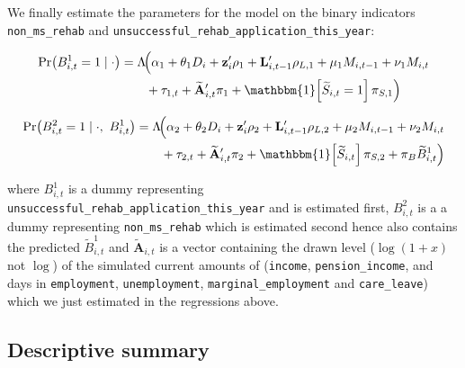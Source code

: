 \documentclass[a4paper,12pt]{article}
\theoremstyle{plain}
\theoremstyle{definition}
\theoremstyle{TheoremNum}
\theoremstyle{CorollaryNum}
\theoremstyle{PropositionNum}
\theoremstyle{TheoremNum}
\begin{document}
We finally estimate the parameters for the model on the binary indicators \texttt{non\_ms\_rehab} and \texttt{unsuccessful\_rehab\_application\_this\_year}:

\begin{align*}
\Pr\!\left(B_{i,t}^{1}=1 \mid \cdot\right)
&=
\Lambda\!\Big(
    \alpha_1
    + \theta_1 D_i
    + \mathbf{z}_i'\rho_1
    + \mathbf{L}_{i,t-1}'\rho_{L,1}
    + \mu_1 M_{i,t-1}
    + \nu_1 M_{i,t} \\
&\qquad
    + \tau_{1,t}
    + \widetilde{\mathbf{A}}_{i,t}'\pi_1
    + \mathbbm{1}\!\left[\widetilde{S}_{i,t}=1\right]\pi_{S,1}
\Big)
\end{align*}

\begin{align*}
\Pr\!\left(B_{i,t}^{2}=1 \mid \cdot,\ B_{i,t}^{1}\right)
&=
\Lambda\!\Big(
    \alpha_2
    + \theta_2 D_i
    + \mathbf{z}_i'\rho_2
    + \mathbf{L}_{i,t-1}'\rho_{L,2}
    + \mu_2 M_{i,t-1}
    + \nu_2 M_{i,t} \\
&\qquad
    + \tau_{2,t}
    + \widetilde{\mathbf{A}}_{i,t}'\pi_2
    + \mathbbm{1}\!\left[\widetilde{S}_{i,t}\right]\pi_{S,2}
    + \pi_B \widetilde{B}_{i,t}^{1}
\Big)
\end{align*}


where $B_{i,t}^1$ is a dummy representing \texttt{unsuccessful\_rehab\_application\_this\_year} and is estimated first, $B_{i,t}^2$ is a a dummy representing \texttt{non\_ms\_rehab} which is estimated second hence also contains the predicted $\widetilde{B}_{i,t}^{1}$ and $\widetilde{\mathbf{A}}_{i,t}$ is a vector containing the drawn level ($\log (1+x)$ not $\log$) of the simulated current amounts of (\texttt{income}, \texttt{pension\_income}, and days in \texttt{employment}, \texttt{unemployment}, \texttt{marginal\_employment} and \texttt{care\_leave}) which we just estimated in the regressions above.

\subsection*{Descriptive summary}
\makeatletter
\def\@currentlabelname{Updating the evolution of $\mathbf{L}_{i,t}$}
\makeatother
\label{app:descriptives}
\end{document}
